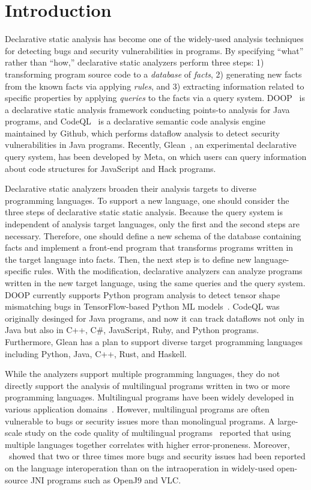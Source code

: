 \section{Introduction}
Declarative static analysis has become one of the widely-used analysis techniques
for detecting bugs and security vulnerabilities in programs.
By specifying ``what'' rather than ``how,''
declarative static analyzers perform three steps:
1) transforming program source code to a {\it database}
of {\it facts}, 2) generating new facts from the known facts via applying
{\it rules}, and 3) extracting information related to specific properties by
applying {\it queries} to the facts via a query system.  DOOP~\cite{doop} is a
declarative static analysis framework conducting points-to analysis for Java
programs, and CodeQL~\cite{codeql} is a declarative semantic code analysis engine
maintained by Github, which performs dataflow analysis to detect security
vulnerabilities in Java programs.  Recently, Glean~\cite{glean}, an experimental
declarative query system, has been developed by Meta, on which users can query
information about code structures for JavaScript and Hack programs.

Declarative static analyzers broaden their analysis targets to diverse
programming languages. To support a new language, one should consider
the three steps of declarative static static analysis.  Because the query
system is independent of analysis target languages, only
the first and the second steps are necessary.  Therefore, one should
define a new schema of the database containing facts and implement a
front-end program that transforms programs written in the target language into facts.
Then, the next step is to define new language-specific rules.  With the
modification, declarative analyzers can analyze programs written in the new
target language, using the same queries and the query system.  DOOP currently
supports Python program analysis to detect tensor shape mismatching bugs in
TensorFlow-based Python ML models~\cite{lagouvardos2020static}. CodeQL was
originally desinged for Java programs, and now it can track dataflows not only
in Java but also in C++, C\#, JavaScript, Ruby, and Python programs.
Furthermore, Glean has a plan to support diverse target programming languages
including Python, Java, C++, Rust, and Haskell.

While the analyzers support multiple programming languages, they do not directly
support the analysis of multilingual programs written in two or more
programming languages. Multilingual programs have been widely developed in
various application domains~\cite{kochhar2016large, mergendahlcross}. However,
multilingual programs are often vulnerable to bugs or security issues more than
monolingual programs. A large-scale study on the code quality of multilingual
programs~\cite{kochhar2016large} reported that using multiple languages
together correlates with higher error-proneness. Moreover,
\cite{grichi2020impact}~showed that two or three times more bugs and security
issues had been reported on the language interoperation than on the
intraoperation in widely-used open-source JNI programs such as OpenJ9 and VLC.


